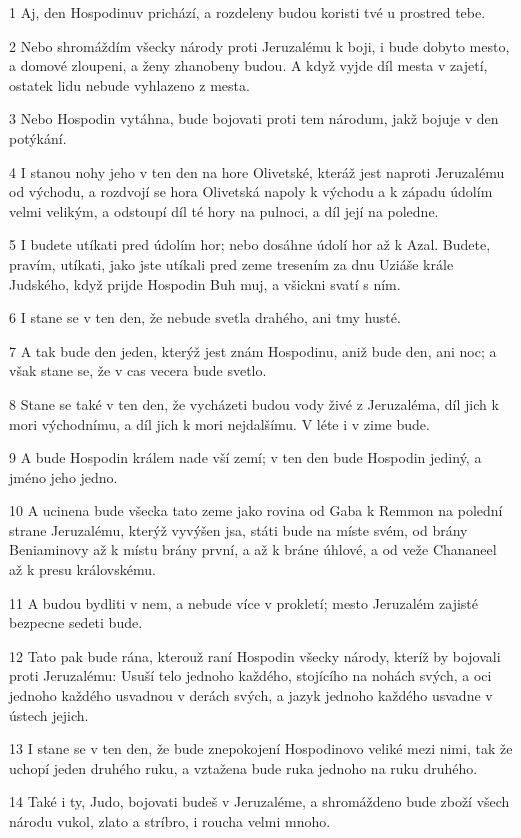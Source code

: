 \par 1 Aj, den Hospodinuv prichází, a rozdeleny budou koristi tvé u prostred tebe.
\par 2 Nebo shromáždím všecky národy proti Jeruzalému k boji, i bude dobyto mesto, a domové zloupeni, a ženy zhanobeny budou. A když vyjde díl mesta v zajetí, ostatek lidu nebude vyhlazeno z mesta.
\par 3 Nebo Hospodin vytáhna, bude bojovati proti tem národum, jakž bojuje v den potýkání.
\par 4 I stanou nohy jeho v ten den na hore Olivetské, kteráž jest naproti Jeruzalému od východu, a rozdvojí se hora Olivetská napoly k východu a k západu údolím velmi velikým, a odstoupí díl té hory na pulnoci, a díl její na poledne.
\par 5 I budete utíkati pred údolím hor; nebo dosáhne údolí hor až k Azal. Budete, pravím, utíkati, jako jste utíkali pred zeme tresením za dnu Uziáše krále Judského, když prijde Hospodin Buh muj, a všickni svatí s ním.
\par 6 I stane se v ten den, že nebude svetla drahého, ani tmy husté.
\par 7 A tak bude den jeden, kterýž jest znám Hospodinu, aniž bude den, ani noc; a však stane se, že v cas vecera bude svetlo.
\par 8 Stane se také v ten den, že vycházeti budou vody živé z Jeruzaléma, díl jich k mori východnímu, a díl jich k mori nejdalšímu. V léte i v zime bude.
\par 9 A bude Hospodin králem nade vší zemí; v ten den bude Hospodin jediný, a jméno jeho jedno.
\par 10 A ucinena bude všecka tato zeme jako rovina od Gaba k Remmon na polední strane Jeruzalému, kterýž vyvýšen jsa, státi bude na míste svém, od brány Beniaminovy až k místu brány první, a až k bráne úhlové, a od veže Chananeel až k presu královskému.
\par 11 A budou bydliti v nem, a nebude více v prokletí; mesto Jeruzalém zajisté bezpecne sedeti bude.
\par 12 Tato pak bude rána, kterouž raní Hospodin všecky národy, kteríž by bojovali proti Jeruzalému: Usuší telo jednoho každého, stojícího na nohách svých, a oci jednoho každého usvadnou v derách svých, a jazyk jednoho každého usvadne v ústech jejich.
\par 13 I stane se v ten den, že bude znepokojení Hospodinovo veliké mezi nimi, tak že uchopí jeden druhého ruku, a vztažena bude ruka jednoho na ruku druhého.
\par 14 Také i ty, Judo, bojovati budeš v Jeruzaléme, a shromáždeno bude zboží všech národu vukol, zlato a stríbro, i roucha velmi mnoho.
